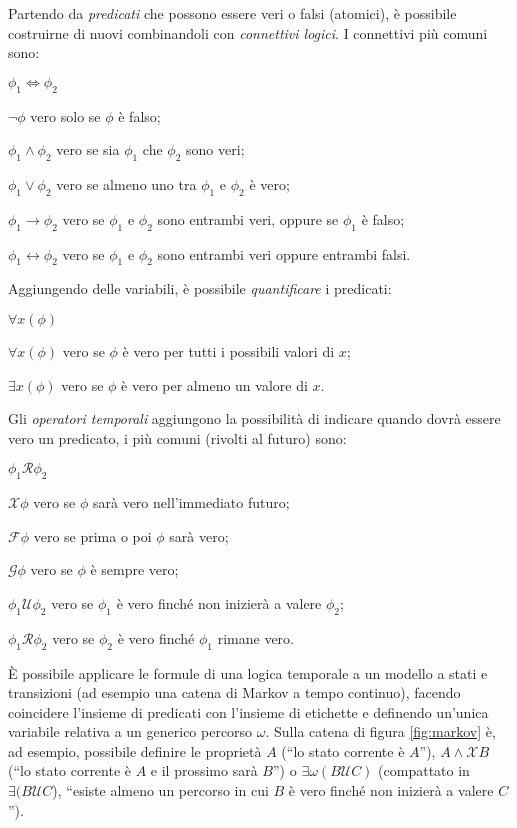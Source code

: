	Partendo da \emph{predicati} che possono essere veri o falsi (atomici), \`e possibile costruirne di nuovi combinandoli con \emph{connettivi logici}. I connettivi pi\`u comuni sono:
	\begin{labeling}{$\phi_1 \iff \phi_2$}
		\item [$\neg \phi$] vero solo se $\phi$ \`e falso;
		\item [$\phi_1 \wedge \phi_2$] vero se sia $\phi_1$ che $\phi_2$ sono veri;
		\item [$\phi_1 \vee \phi_2$] vero se almeno uno tra $\phi_1$ e $\phi_2$ \`e vero;
		\item [$\phi_1 \rightarrow \phi_2$] vero se $\phi_1$ e $\phi_2$ sono entrambi veri, oppure se $\phi_1$ \`e falso;
		\item [$\phi_1 \leftrightarrow \phi_2$] vero se $\phi_1$ e $\phi_2$ sono entrambi veri oppure entrambi falsi.
	\end{labeling}
	
	Aggiungendo delle variabili, \`e possibile \emph{quantificare} i predicati:
	\begin{labeling}{$\forall x (\phi)$}
		\item [$\forall x (\phi)$] vero se $\phi$ \`e vero per tutti i possibili valori di $x$;
		\item [$\exists x (\phi)$] vero se $\phi$ \`e vero per almeno un valore di $x$.
	\end{labeling}
	
	Gli \emph{operatori temporali} aggiungono la possibilit\`a di indicare quando dovr\`a essere vero un predicato, i pi\`u comuni (rivolti al futuro) sono:
	\begin{labeling}{$\phi_1 \mathcal{R} \phi_2$}
		\item [$\mathcal{X} \phi$] vero se $\phi$ sar\`a vero nell'immediato futuro;
		\item [$\mathcal{F} \phi$] vero se prima o poi $\phi$ sar\`a vero;
		\item [$\mathcal{G} \phi$] vero se $\phi$ \`e sempre vero;
		\item [$\phi_1 \mathcal{U} \phi_2$] vero se $\phi_1$ \`e vero finch\'e non inizier\`a a valere $\phi_2$;
		\item [$\phi_1 \mathcal{R} \phi_2$] vero se $\phi_2$ \`e vero finch\'e $\phi_1$ rimane vero.
	\end{labeling}
	
	\`E possibile applicare le formule di una logica temporale a un modello a stati e transizioni (ad esempio una catena di Markov a tempo continuo), facendo coincidere l'insieme di predicati con l'insieme di etichette e definendo un'unica variabile relativa a un generico percorso $\omega$.
	Sulla catena di figura \ref{fig:markov} \`e, ad esempio, possibile definire le propriet\`a $A$ (``lo stato corrente \`e $A$''), $A \wedge \mathcal{X} B$ (``lo stato corrente \`e $A$ e il prossimo sar\`a $B$'') o $\exists \omega (B \mathcal{U} C)$ (compattato in $\exists(B \mathcal{U} C$), ``esiste almeno un percorso in cui $B$ \`e vero finch\'e non inizier\`a a valere $C$'').
	
